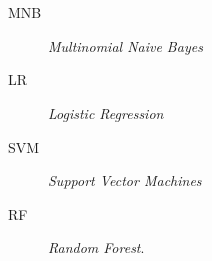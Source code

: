 \chapter*{\nomeglosarioacronimos}
\label{chap:acronimos}
\thispagestyle{plain}
\fancyhead{}


\begin{description}
\item [MNB] \emph{Multinomial Naive Bayes}
\item [LR] \emph {Logistic Regression}
\item [SVM] \emph {Support Vector Machines}
 \item [RF] \emph{Random Forest}.
\end{description}

